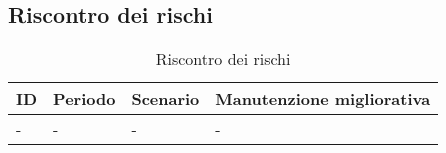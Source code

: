 \begin{appendices}
\section{Riscontro dei rischi}
	\begin{longtable}{ 
		>{\centering}p{} 
		>{\centering}p{}
		>{\centering\arraybackslash}p{}
		>{\centering\arraybackslash}p{} }
	
		\caption {Riscontro dei rischi} \\
			
		\textbf{\color{white}ID} & 
		\textbf{\color{white}Periodo} & 
		\textbf{\color{white}Scenario} &
		\textbf{\color{white}Manutenzione migliorativa}
		\tabularnewline  
		\endhead
	
		- & - & - & - \\
	\end{longtable}
\end{appendices}